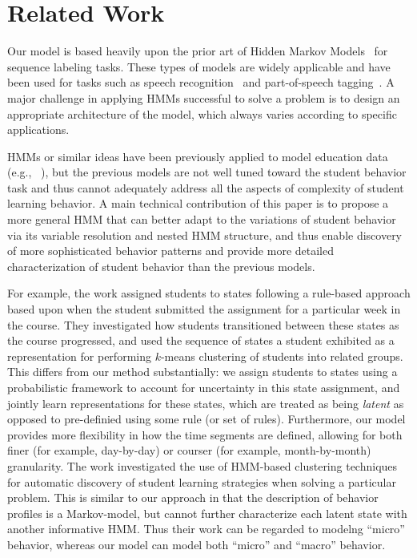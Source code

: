 \section{Related Work}

Our model is based heavily upon the prior art of Hidden Markov
Models~\cite{Rabiner:1990:RSR} for sequence labeling tasks. These types of
models are widely applicable and have been used for tasks such as speech
recognition~\cite{Huang:1990:HMM} and part-of-speech
tagging~\cite{Jurafsky:2009:SLP}. A major challenge in applying HMMs successful to solve a problem is to design an appropriate architecture of the model, which always varies according to specific applications. 

HMMs or similar ideas have been previously 
applied to model education data (e.g., ~\cite{Shih:2010:EDM,Kizilcec:2013:LAK}), but the previous models are not well tuned toward the student behavior task and thus cannot
adequately address all the aspects of complexity of student learning behavior. 
A main technical contribution of this paper is to propose a more general
HMM that can better adapt to the variations of student behavior via its variable resolution
and nested HMM structure, and thus enable discovery of more sophisticated behavior patterns and provide more detailed characterization of student behavior than the previous models.
 
For example, the work \citet{Kizilcec:2013:LAK} assigned students to states following a rule-based
approach based upon when the student submitted the assignment for a
particular week in the course. They investigated how students transitioned
between these states as the course progressed, and used the sequence of
states a student exhibited as a representation for performing $k$-means
clustering of students into related groups. This differs from our method
substantially: we assign students to states using a probabilistic
framework to account for uncertainty in this state assignment, and jointly
learn representations for these states, which are treated as being
\emph{latent} as opposed to pre-definied using some rule (or set of rules).
Furthermore, our model provides more flexibility in how the time segments
are defined, allowing for both finer (for example, day-by-day) or courser
(for example, month-by-month) granularity. The work \citet{Shih:2010:EDM} investigated the use of HMM-based clustering
techniques for automatic discovery of student learning strategies when
solving a particular problem. This is similar to our approach in that the
description of behavior profiles is a Markov-model, but cannot further characterize
each latent state with another informative HMM. Thus their work can be regarded
to modelng ``micro'' behavior, whereas our model can model both ``micro'' and ``macro'' behavior. 
%

